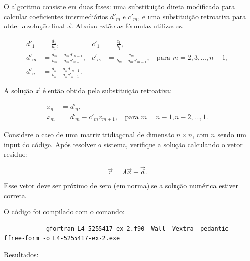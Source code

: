 \documentclass[12pt, a4paper]{article} %
\begin{document}
        O algoritmo consiste em duas fases: uma substitui\c{c}\~ao direta modificada para calcular coeficientes intermedi\'arios $d'_m$ e $c'_m$, e uma substitui\c{c}\~ao retroativa para obter a solu\c{c}\~ao final $\vec{x}$. Abaixo est\~ao as f\'ormulas utilizadas:
        
        \begin{align*}
        d'_1 &= \frac{d_1}{b_1}, &
        c'_1 &= \frac{c_1}{b_1}, \\
        d'_m &= \frac{d_m - a_m d'_{m-1}}{b_m - a_m c'_{m-1}}, &
        c'_m &= \frac{c_m}{b_m - a_m c'_{m-1}}, \quad \text{para } m = 2, 3, \dots, n-1, \\
        d'_n &= \frac{d_n - a_n d'_{n-1}}{b_n - a_n c'_{n-1}}.
        \end{align*}
        
        A solu\c{c}\~ao $\vec{x}$ \'e ent\~ao obtida pela substitui\c{c}\~ao retroativa:
        
        \begin{align*}
        x_n &= d'_n, \\
        x_m &= d'_m - c'_m x_{m+1}, \quad \text{para } m = n-1, n-2, \dots, 1.
        \end{align*}
        
        Considere o caso de uma matriz tridiagonal de dimens\~ao $n \times n$, com $n$ sendo um input do c\'odigo. Ap\'os resolver o sistema, verifique a solu\c{c}\~ao calculando o vetor res\'iduo:
        
        \[
        \vec{r} = A\vec{x} - \vec{d}.
        \]
        
        Esse vetor deve ser pr\'oximo de zero (em norma) se a solu\c{c}\~ao num\'erica estiver correta.        

        O c\'odigo foi compilado com o comando:
        \begin{verbatim}
            gfortran L4-5255417-ex-2.f90 -Wall -Wextra -pedantic -ffree-form -o L4-5255417-ex-2.exe  
        \end{verbatim}

        Resultados:
\end{document}
